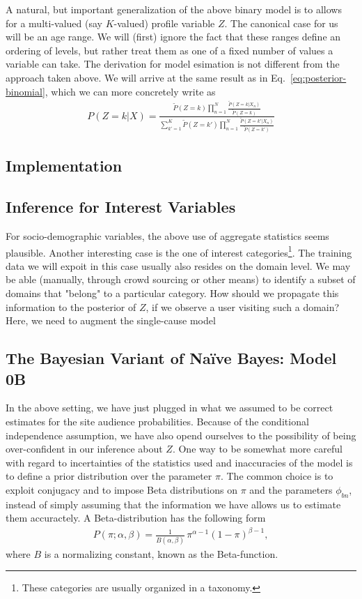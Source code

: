 \documentclass{article}
\begin{document}
A natural, but important generalization of the above binary model is to allows for a multi-valued (say $K$-valued) profile variable $Z$. The canonical case for us will be an age range. We will (first) ignore the fact that these ranges define an ordering of levels, but rather treat them as one of a fixed number of values a variable can take. The derivation for model esimation is not different from the approach taken above. We will arrive at the same result as in Eq.~\ref{eq:posterior-binomial}, which we can more concretely write as 
\begin{align}
P(Z=k|X) = \frac{
   \tilde P(Z=k) \prod_{n=1}^N \frac{\tilde P(Z=k|X_n)}{\tilde P(Z=k)}
} {
\sum_{k'=1}^K 
   \tilde P(Z=k') \prod_{n=1}^N \frac{\tilde P(Z=k'|X_n)}{\tilde P(Z=k')}
}
\end{align}

\subsection{Implementation}

\newpage


\subsection{Inference for Interest Variables} 

For socio-demographic variables, the above use of aggregate statistics seems plausible. Another interesting case is the one of interest categories\footnote{These categories are usually organized in a taxonomy.}. The training data we will expoit in this case usually also resides on the domain level. We may be able (manually, through crowd sourcing or other means) to identify a subset of domains that "belong" to a particular category. How should we propagate this information to the posterior of $Z$, if we observe a user visiting such a domain? Here, we need to augment the single-cause model 


\newpage



\subsection{The Bayesian Variant of Na\"ive Bayes: Model 0B}

In the above setting, we have just plugged in what we assumed to be correct estimates for the site audience probabilities. Because of the conditional independence assumption, we have also opend ourselves to the possibility of being over-confident in our inference about $Z$. One way to be somewhat more careful with regard to incertainties of the statistics used and inaccuracies of the model is to define a prior distribution over the parameter $\pi$. The common choice is to exploit conjugacy and to impose Beta distributions on $\pi$ and the parameters $\phi_{bn}$, instead of simply assuming that the information we have allows us to estimate them accuractely. A Beta-distribution has the following form 
\begin{align}
P(\pi; \alpha,\beta) = \frac1{B(\alpha,\beta)} \, \pi^{\alpha-1}(1-\pi)^{\beta-1},
\end{align}
where $B$ is a normalizing constant, known as the Beta-function. 
\end{document}
